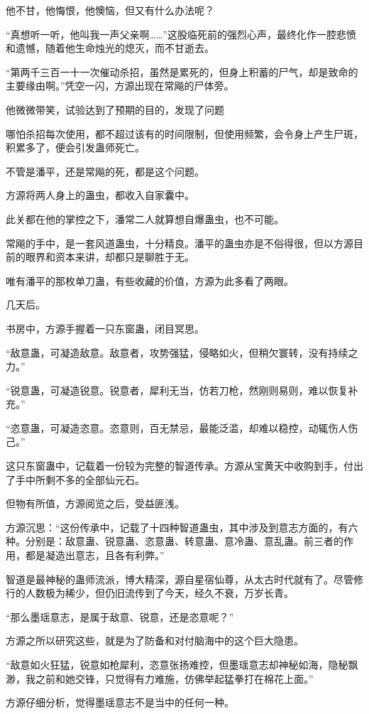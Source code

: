 \begin{this_body}
他不甘，他悔恨，他懊恼，但又有什么办法呢？

“真想听一听，他叫我一声父亲啊……”这股临死前的强烈心声，最终化作一腔悲愤和遗憾，随着他生命烛光的熄灭，而不甘逝去。

“第两千三百一十一次催动杀招，虽然是累死的，但身上积蓄的尸气，却是致命的主要缘由啊。”凭空一闪，方源出现在常飚的尸体旁。

他微微带笑，试验达到了预期的目的，发现了问题

哪怕杀招每次使用，都不超过该有的时间限制，但使用频繁，会令身上产生尸斑，积累多了，便会引发蛊师死亡。

不管是潘平，还是常飚的死，都是这个问题。

方源将两人身上的蛊虫，都收入自家囊中。

此关都在他的掌控之下，潘常二人就算想自爆蛊虫，也不可能。

常飚的手中，是一套风道蛊虫，十分精良。潘平的蛊虫亦是不俗得很，但以方源目前的眼界和资本来讲，却都只是聊胜于无。

唯有潘平的那枚单刀蛊，有些收藏的价值，方源为此多看了两眼。

几天后。

书房中，方源手握着一只东窗蛊，闭目冥思。

“敌意蛊，可凝造敌意。敌意者，攻势强猛，侵略如火，但稍欠寰转，没有持续之力。”

“锐意蛊，可凝造锐意。锐意者，犀利无当，仿若刀枪，然刚则易则，难以恢复补充。”

“恣意蛊，可凝造恣意。恣意则，百无禁忌，最能泛滥，却难以稳控，动辄伤人伤己。”

这只东窗蛊中，记载着一份较为完整的智道传承。方源从宝黄天中收购到手，付出了手中所剩不多的全部仙元石。

但物有所值，方源阅览之后，受益匪浅。

方源沉思：“这份传承中，记载了十四种智道蛊虫，其中涉及到意志方面的，有六种。分别是：敌意蛊、锐意蛊、恣意蛊、转意蛊、意冷蛊、意乱蛊。前三者的作用，都是凝造出意志，且各有利弊。”

智道是最神秘的蛊师流派，博大精深，源自星宿仙尊，从太古时代就有了。尽管修行的人数极为稀少，但仍旧流传到了今天，经久不衰，万岁长青。

“那么墨瑶意志，是属于敌意、锐意，还是恣意呢？”

方源之所以研究这些，就是为了防备和对付脑海中的这个巨大隐患。

“敌意如火狂猛，锐意如枪犀利，恣意张扬难控，但墨瑶意志却神秘如海，隐秘飘渺，我之前和她交锋，只觉得有力难施，仿佛举起猛拳打在棉花上面。”

方源仔细分析，觉得墨瑶意志不是当中的任何一种。


\end{this_body}
